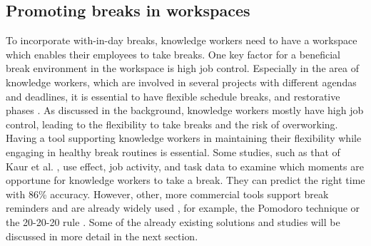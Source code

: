\documentclass{hasel_thesis}
\begin{document}
\subsection{Promoting breaks in workspaces}
To incorporate with-in-day breaks, knowledge workers need to have a workspace which enables their employees to take breaks. One key factor for a beneficial break environment in the workspace is high job control. Especially in the area of knowledge workers, which are involved in several projects with different agendas and deadlines, it is essential to have flexible schedule breaks, and restorative phases \cite{Trougakos.2009}. As discussed in the background, knowledge workers mostly have high job control, leading to the flexibility to take breaks and the risk of overworking. Having a tool supporting knowledge workers in maintaining their flexibility while engaging in healthy break routines is essential. Some studies, such as that of Kaur et al. \cite{Kaur.2020}, use effect, job activity, and task data to examine which moments are opportune for knowledge workers to take a break. They can predict the right time with 86\% accuracy. However, other, more commercial tools support break reminders and are already widely used \cite{Alghamdi.2020}, for example, the Pomodoro technique \cite{Cirillo.2006} or the 20-20-20 rule \cite{Min.2019}. Some of the already existing solutions and studies will be discussed in more detail in the next section.
 


\begin{comment} 
Desired benefits were shared, but subjective
When asked to explain what makes a break good and/or
successful, 112 respondents (76%
state upon returning to work. Examples include breaks that
“cleared my mind”, where they returned “refreshed”,
“refocused”, “relaxed”, or “recharged”, or that the break
“lowered my stress.” An overall theme was that workers return
from a successful break feeling ready to work. 

Kaur et al. \cite{Kaur.2020} explored the finding of opportune moments for knowledge workers to take a break, using affect, workstation activity and task data. Their study demonstrated a 86\% accuracy of the approach for predicting opportune moments. In addition, several commercial approaches and tools that support reminders for taking breaks exist and are already widely used \cite{Alghamdi.2020}, for example the Pomodoro technique \cite{Cirillo.2006} or the 20-20-20 rule \cite{Min.2019}. Packer et al. \cite{Packer.2021} showed that micro-breaks have a restorative effect on well-being and focus.  However, finding the timing of the micro-break is essential as shown by Kaur et al. \cite{Kaur.2020}. Nevertheless, different studies \cite{KimS.ParkY.&Niu.2017} \cite{Berman.2007} have demonstrated that there is no one "perfect" break schedule that suits everyone. While some people prefer and benefit more from having regular short breaks to the coffee machine, others prefer to go for a walk during their lunch break. Therefore, finding opportune moments for a good break and knowing how best to spend them remains a challenge. 
\end{comment}
\end{document}
